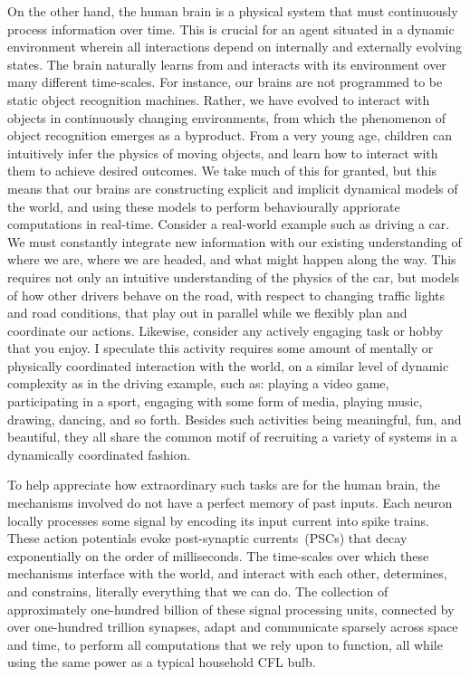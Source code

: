 On the other hand, the human brain is a physical system that must continuously process information over time.
This is crucial for an agent situated in a dynamic environment wherein all interactions depend on internally and externally evolving states.
The brain naturally learns from and interacts with its environment over many different time-scales. 
For instance, our brains are not programmed to be static object recognition machines. Rather, we have evolved to interact with objects in continuously changing environments, from which the phenomenon of object recognition emerges as a byproduct.
From a very young age, children can intuitively infer the physics of moving objects, and learn how to interact with them to achieve desired outcomes.
We take much of this for granted, but this means that our brains are constructing explicit and implicit dynamical models of the world, and using these models
to perform behaviourally appriorate computations in real-time.
Consider a real-world example such as driving a car. We must constantly integrate new information with our existing understanding of where we are, where we are headed, and what might happen along the way.
This requires not only an intuitive understanding of the physics of the car, but models of how other drivers behave on the road, with respect to changing traffic lights and road conditions, that play out in parallel while we flexibly plan and coordinate our actions.
Likewise, consider any actively engaging task or hobby that you enjoy.
I speculate this activity requires some amount of mentally or physically coordinated interaction with the world, on a similar level of dynamic complexity as in the driving example, such as: playing a video game, participating in a sport, engaging with some form of media, playing music, drawing, dancing, and so forth.
Besides such activities being meaningful, fun, and beautiful, they all share the common motif of recruiting a variety of systems in a dynamically coordinated fashion.

To help appreciate how extraordinary such tasks are for the human brain, the mechanisms involved do not have a perfect memory of past inputs.
Each neuron locally processes some signal by encoding its input current into spike trains.
These action potentials evoke post-synaptic currents~(PSCs) that decay exponentially on the order of milliseconds.
The time-scales over which these mechanisms interface with the world, and interact with each other, determines, and constrains, literally everything that we can do.
The collection of approximately one-hundred billion of these signal processing units, connected by over one-hundred trillion synapses, adapt and communicate sparsely across space and time, to perform all computations that we rely upon to function, all while using the same power as a typical household CFL bulb.

